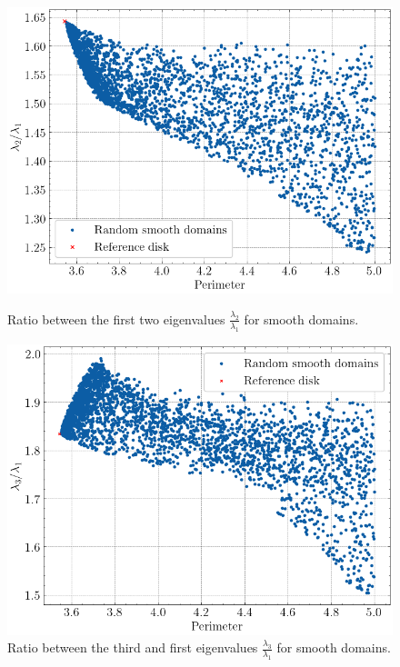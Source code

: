 \begin{figure}[!htb]
    \begin{minipage}[c]{0.45\textwidth}
        \centering
        \includegraphics[width=\textwidth]{Images/Dirac/smooth/smooth_domains_scatter_benguria.png}
        \caption{Ratio between the first two eigenvalues \(\frac{\lambda_2}{\lambda_1}\) for smooth domains.}
        \label{dirac_smooth_domains_scatter_benguria}
    \end{minipage}
    \hfill
    \begin{minipage}[c]{0.45\textwidth}
        \centering
        \includegraphics[width=\textwidth]{Images/Dirac/smooth/smooth_domains_scatter_benguria_third.png}
        \caption{Ratio between the third and first eigenvalues \(\frac{\lambda_3}{\lambda_1}\) for smooth domains.}
        \label{dirac_smooth_domains_scatter_benguria_third}
    \end{minipage}
\end{figure}

